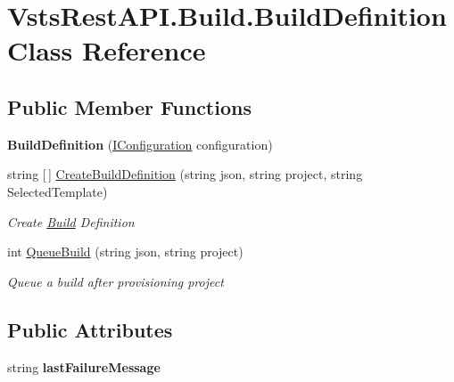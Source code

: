 \hypertarget{class_vsts_rest_a_p_i_1_1_build_1_1_build_definition}{}\section{Vsts\+Rest\+A\+P\+I.\+Build.\+Build\+Definition Class Reference}
\label{class_vsts_rest_a_p_i_1_1_build_1_1_build_definition}
\subsection*{Public Member Functions}
\begin{DoxyCompactItemize}
\item 
\mbox{\label{class_vsts_rest_a_p_i_1_1_build_1_1_build_definition_acaf28338b85b2eb9b5c5f8b6ebe43c51}} 
{\bfseries Build\+Definition} (\mbox{\hyperlink{interface_vsts_rest_a_p_i_1_1_i_configuration}{I\+Configuration}} configuration)
\item 
string \mbox{[}$\,$\mbox{]} \mbox{\hyperlink{class_vsts_rest_a_p_i_1_1_build_1_1_build_definition_a6b0baf93fe915e1eb9a9f028a9f0136a}{Create\+Build\+Definition}} (string json, string project, string Selected\+Template)
\begin{DoxyCompactList}\small\item\em Create \mbox{\hyperlink{namespace_vsts_rest_a_p_i_1_1_build}{Build}} Definition \end{DoxyCompactList}\item 
int \mbox{\hyperlink{class_vsts_rest_a_p_i_1_1_build_1_1_build_definition_a6f176c07809293c0b2efd1d3eb0cffcc}{Queue\+Build}} (string json, string project)
\begin{DoxyCompactList}\small\item\em Queue a build after provisioning project \end{DoxyCompactList}\end{DoxyCompactItemize}
\subsection*{Public Attributes}
\begin{DoxyCompactItemize}
\item 
\mbox{\label{class_vsts_rest_a_p_i_1_1_build_1_1_build_definition_a3a51743edc98c77291926915e35b76c0}} 
string {\bfseries last\+Failure\+Message}
\end{DoxyCompactItemize}


